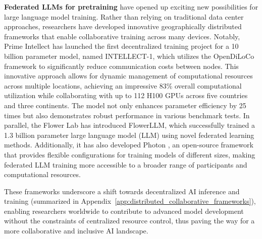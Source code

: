 \textbf{Federated LLMs for pretraining} 
have opened up exciting new possibilities for large language model training. Rather than relying on traditional data center approaches, researchers have developed innovative geographically distributed frameworks that enable collaborative training across many devices.
Notably, Prime Intellect \cite{OpenDiLoCo} has launched the first decentralized training project for a 10 billion parameter model, named INTELLECT-1, which utilizes the OpenDiLoCo framework to significantly reduce communication costs between nodes. This innovative approach allows for dynamic management of computational resources across multiple locations, achieving an impressive 83\% overall computational utilization while collaborating with up to 112 H100 GPUs across five countries and three continents. The model not only enhances parameter efficiency by 25 times but also demonstrates robust performance in various benchmark tests.
In parallel, the Flower Lab \cite{Flower} has introduced FlowerLLM, which successfully trained a 1.3 billion parameter large language model (LLM) using novel federated learning methods. 
Additionally, it has also developed Photon \cite{sani2024photon}, an open-source framework that provides flexible configurations for training models of different sizes, making federated LLM training more accessible to a broader range of participants and computational resources.

These frameworks underscore a shift towards decentralized AI inference and training (summarized in Appendix~\ref{app:distributed_collaborative_frameworks}), enabling researchers worldwide to contribute to advanced model development without the constraints of centralized resource control, thus paving the way for a more collaborative and inclusive AI landscape.


